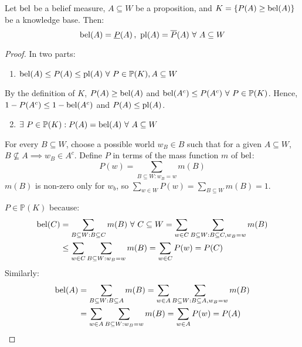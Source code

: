 \begin{thm}
  Let $\operatorname*{bel}$ be a belief measure, $A \subseteq W$ be a proposition, and
  $K = \{ P(A) \geq \operatorname*{bel}(A) \}$ be a knowledge base. Then:
  \begin{equation}
    \operatorname*{bel}(A) = \underline{P}(A)\,,\
    \operatorname*{pl}(A) = \overline{P}(A)
    \ \forall\ A \subseteq W
  \end{equation}
  \begin{proof}
    In two parts:
    \begin{enumerate}
      \item $\bel(A) \leq P(A) \leq \pl(A) \ \forall\ P \in \mathbb{P}(K), A \subseteq W$
    \end{enumerate}

    By the definition of $K$,
    $P(A) \geq \operatorname*{bel}(A)$ and $\operatorname*{bel}(A^c) \leq P(A^c) \ \forall\ P \in \mathbb{P}(K)$.
    Hence, $1 - P(A^c) \leq 1 - \operatorname*{bel}(A^c)$ and $P(A) \leq \operatorname*{pl}(A)$.

    \begin{enumerate}
      \setcounter{enumi}{1}
      \item $\exists\ P \in \mathbb{P}(K) : P(A) = \operatorname*{bel}(A) \ \forall\ A \subseteq W$
    \end{enumerate}

    For every $B \subseteq W$, choose a possible world $w_B \in B$ such that
    for a given $A \subseteq W$,  $B \not\subseteq A \implies w_B \in A^c$.
    Define $P$ in terms of the mass function $m$ of $\operatorname*{bel}$:
    \begin{equation*}
      P(w) = \sum_{B \subseteq W : w_B = w} m(B)
    \end{equation*}
    $m(B)$ is non-zero only for $w_b$, so
    $\sum_{w \in W} P(w) = \sum_{B \subseteq W} m(B) = 1$.

    $P \in \mathbb{P}(K)$ because:
    \begin{align*}
      \operatorname*{bel}(C)
       & = \sum_{B \subseteq W : B \subseteq C} m(B) \ \forall\ C \subseteq W
      = \sum_{w \in C} \sum_{B \subseteq W : B \subseteq C, w_B = w} m(B)     \\
       & \leq \sum_{w \in C} \sum_{B \subseteq W : w_B = w} m(B)
      = \sum_{w \in C} P(w)
      = P(C)
    \end{align*}
    Similarly:
    \begin{align*}
      \operatorname*{bel}(A)
       & = \sum_{B \subseteq W : B \subseteq A} m(B)
      = \sum_{w \in A} \sum_{B \subseteq W : B \subseteq A, w_B = w} m(B) \\
       & = \sum_{w \in A} \sum_{B \subseteq W : w_B = w} m(B)
      = \sum_{w \in A} P(w)
      = P(A)
    \end{align*}
  \end{proof}
\end{thm}

